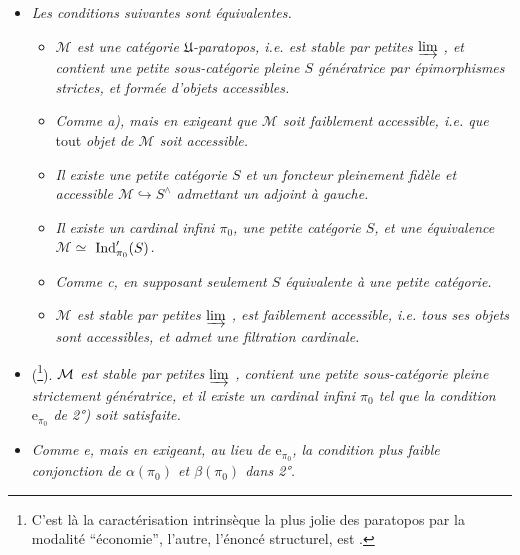 \begin{itemize}[leftmargin=2.5em]
\item[\textit{3°)}] \textit{Les conditions suivantes sont équivalentes.}
\begin{itemize}[leftmargin=3em]
\item[\textit{a)}] \textit{$\mathcal{M}$ est une catégorie $\mathfrak{U}$-paratopos, i.e. est stable par petites $\varinjlim$ , et contient une petite sous-catégorie pleine $S$ génératrice par épimorphismes strictes, et formée d'objets accessibles.} %
\item[\textit{a$'$)}] \textit{Comme a), mais en exigeant que $\mathcal{M}$ soit faiblement accessible, i.e. que} tout \textit{objet de $\mathcal{M}$ soit accessible.}
\item[\textit{b)}] \textit{Il existe une petite catégorie $S$ et un foncteur pleinement fidèle et accessible $\mathcal{M}\hookrightarrow S^{\wedge}$ admettant un adjoint à gauche.}
\item[\circled{c}] \textit{Il existe un cardinal infini $\pi_0$, une petite catégorie $S$, et une équivalence $\mathcal{M}\simeq$ $\operatorname{Ind}'_{\pi_0}(S)$.}
\item[\textit{c$'$)}] \textit{Comme c, en supposant seulement $S$ équivalente à une petite catégorie.}
\item[\textit{d)}] \textit{$\mathcal{M}$ est stable par petites $\varinjlim$ , est faiblement accessible, i.e. tous ses objets sont accessibles, et admet une filtration cardinale.}
\end{itemize}
\end{itemize}


\begin{itemize}[leftmargin=4em]
\item[\circled{e}] (\footnote[60]{C'est là la caractérisation intrinsèque la plus jolie des paratopos par la modalité “économie”, l'autre, l'énoncé structurel, est  .}). \textit{$\mathcal{M}$ est stable par petites $\varinjlim$ , contient une petite sous-catégorie pleine strictement génératrice, et il existe un cardinal infini $\pi_0$ tel que la condition $\mathrm{e}_{\pi_0}$ de 2°) soit satisfaite.}
\item[\circled{e$'$}] \textit{Comme e, mais en exigeant, au lieu de $\mathrm{e}_{\pi_0}$, la condition plus faible conjonction de $\alpha(\pi_0)$ et $\beta(\pi_0)$ dans 2°.}
\end{itemize}

